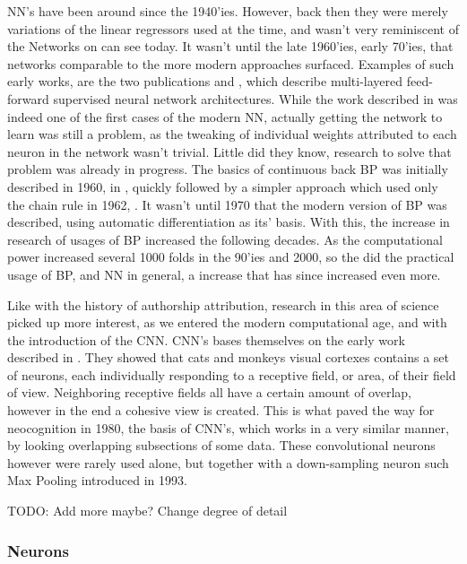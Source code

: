 \gls{NN}'s have been around since the 1940'ies. However, back then they were
merely variations of the linear regressors used at the time, and wasn't
very reminiscent of the Networks on can see today. It wasn't until the
late 1960'ies, early 70'ies, that networks comparable to the more modern
approaches surfaced. Examples of such early works, are the two publications
\cite{ivakhnenko1973cybernetic} and \cite{4308320}, which describe multi-layered
feed-forward supervised neural network architectures. While the work described
in \cite{4308320} was indeed one of the first cases of the modern \gls{NN},
actually getting the network to learn was still a problem, as the tweaking of
individual weights attributed to each neuron in the network wasn't trivial.
Little did they know, research to solve that problem was already in progress.
The basics of continuous back \gls{BP} was initially described in 1960, in
\cite{Kelley1960}, quickly followed by a simpler approach which used only the
chain rule in 1962, \cite{DREYFUS196230}. It wasn't until 1970 that the modern
version of \gls{BP} was described, using automatic differentiation as its'
basis. With this, the increase in research of usages of \gls{BP} increased the
following decades. As the computational power increased several 1000 folds in
the 90'ies and 2000, so the did the practical usage of \gls{BP}, and \gls{NN} in
general, a increase that has since increased even more. \cite{Schmidhuber:2015}

Like with the history of authorship attribution, research in this area of
science picked up more interest, as we entered the modern computational age,
and with the introduction of the \gls{CNN}. \gls{CNN}'s bases themselves on
the early work described in \cite{TJP:TJP19681951215}. They showed that cats
and monkeys visual cortexes contains a set of neurons, each individually
responding to a receptive field, or area, of their field of view. Neighboring
receptive fields all have a certain amount of overlap, however in the end
a cohesive view is created. This is what paved the way for neocognition
in 1980\cite{Fukushima1980}, the basis of \gls{CNN}'s, which works in a
very similar manner, by looking overlapping subsections of some data. These
convolutional neurons however were rarely used alone, but together with a
down-sampling neuron such Max Pooling introduced in 1993.\cite{Schmidhuber:2015}

TODO: Add more maybe? Change degree of detail

\subsubsection{Neurons}

